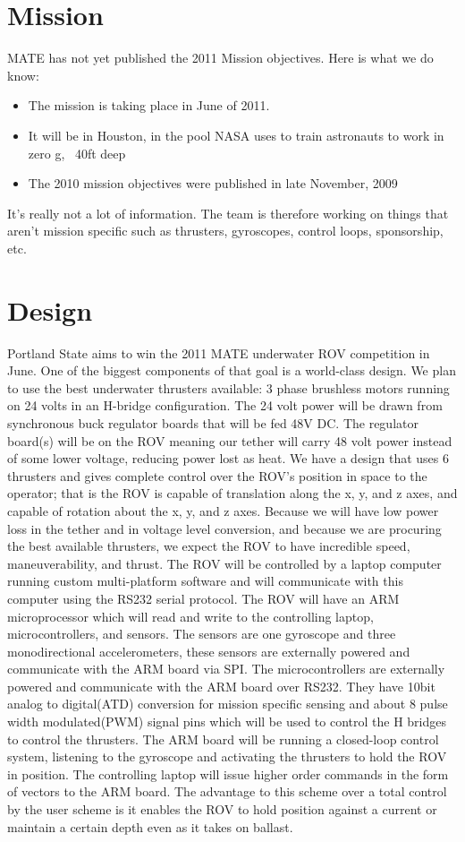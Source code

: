 \documentclass{proposalnsf}
\begin{document}
\section{Mission}

MATE has not yet published the 2011 Mission objectives. Here is what we do know:
\begin{itemize}
\item The mission is taking place in June of 2011.
\item It will be in Houston, in the pool NASA uses to train astronauts to work in zero g, ~40ft deep
\item The 2010 mission objectives were published in late November, 2009
\end{itemize}
It's really not a lot of information. The team is therefore working on things that aren't mission specific such as thrusters, gyroscopes, control loops, sponsorship, etc.


\section{Design}
Portland State aims to win the 2011 MATE underwater ROV competition in June. One of the biggest components of that goal is a world-class design. We plan to use the best underwater thrusters available: 3 phase brushless motors running on 24 volts in an H-bridge configuration. The 24 volt power will be drawn from synchronous buck regulator boards that will be fed 48V DC. The regulator board(s) will be on the ROV meaning our tether will carry 48 volt power instead of some lower voltage, reducing power lost as heat. We have a design that uses 6 thrusters and gives complete control over the ROV’s position in space to the operator; that is the ROV is capable of translation along the x, y, and z axes, and capable of rotation about the x, y, and z axes. Because we will have low power loss in the tether and in voltage level conversion, and because we are procuring the best available thrusters, we expect the ROV to have incredible speed, maneuverability, and thrust. The ROV will be controlled by a laptop computer running custom multi-platform software and will communicate with this computer using the RS232 serial protocol. The ROV will have an ARM microprocessor which will read and write to the controlling laptop, microcontrollers, and sensors. The sensors are one gyroscope and three monodirectional accelerometers, these sensors are externally powered and communicate with the ARM board via SPI. The microcontrollers are externally powered and communicate with the ARM board over RS232. They have 10bit analog to digital(ATD) conversion for mission specific sensing and about 8 pulse width modulated(PWM) signal pins which will be used to control the H bridges to control the thrusters. The ARM board will be running a closed-loop control system, listening to the gyroscope and activating the thrusters to hold the ROV in position. The controlling laptop will issue higher order commands in the form of vectors to the ARM board. The advantage to this scheme over a total control by the user scheme is it enables the ROV to hold position against a current or maintain a certain depth even as it takes on ballast.
\end{document}
